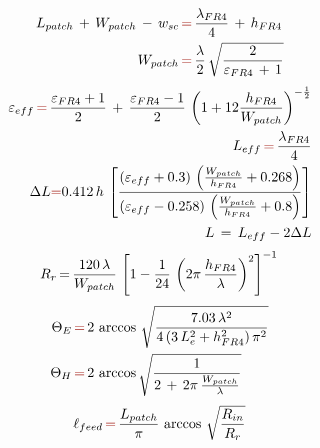 \documentclass[12pt,a4paper]{article}
\begin{document}
{\begin{equation}
	\begin{aligned}L_{patch}\,+\,W_{patch}\,-\,w_{sc}\,&{\color{Mahogany}=}\,\frac{\lambda_{FR4}}{4}\,+\,h_{FR4}\\
		W_{patch}\,&{\color{Mahogany}=}\,\frac{\lambda}{2}\,\sqrt{\frac{2}{\varepsilon_{FR4}\,+\,1}}\\
	\end{aligned}
\label{eq:patch size}
\end{equation}
\begin{equation}
	\begin{aligned}
		\varepsilon_{eff}\,{\color{Mahogany}=}\,\frac{\varepsilon_{FR4}+1}{2}\,+\,\frac{\varepsilon_{FR4}-1}{2}\,\left(1+12\frac{h_{FR4}}{W_{patch}}\right)^{-\frac{1}{2}}\\
		L_{eff}\,{\color{Mahogany}=}\,\frac{\lambda_{FR4}}{4}\\
		\Delta L{\color{Mahogany}=}0.412\,h\,\left[\frac{(\varepsilon_{eff}+0.3)\,\left(\frac{W_{patch}}{h_{FR4}}+0.268\right)}{(\varepsilon_{eff}-0.258)\,\left(\frac{W_{patch}}{h_{FR4}}+0.8\right)}\right]\\
		L\,=\,L_{eff}-2\Delta L
	\end{aligned}
\label{eq:patch effective}
\end{equation}
\begin{equation}
R_r\,{=}\,\frac{120\,\lambda}{W_{patch}}\,\left[1-\frac{1}{24}\,\left(2\pi\,\frac{h_{FR4}}{\lambda}\right)^{2}\right]^{-1}\\
\label{eq:radiation resistance}
\end{equation}
\begin{equation}
	\begin{aligned}
		\Theta_E\,&{\color{Mahogany}=}\,2\,\arccos\,\sqrt{\frac{7.03\,\lambda^2}{4\,(3\,L_e^2+h_{FR4}^2)\,\pi^2}}\\
		\Theta_H\,&{\color{Mahogany}=}\,2\,\arccos\sqrt{\frac{1}{2\,+\,2\pi\,\frac{W_{patch}}{\lambda}}}\\
	\end{aligned}
\label{eq:beamwidth EH cuts}
\end{equation}
\begin{equation}
	\ell_{feed}\,{\color{Mahogany}=}\,\frac{L_{patch}}{\pi}\,\arccos\,\sqrt{\frac{R_{in}}{R_r}}
	\label{eq:feed length coordinate}
\end{equation}

}
\end{document}
